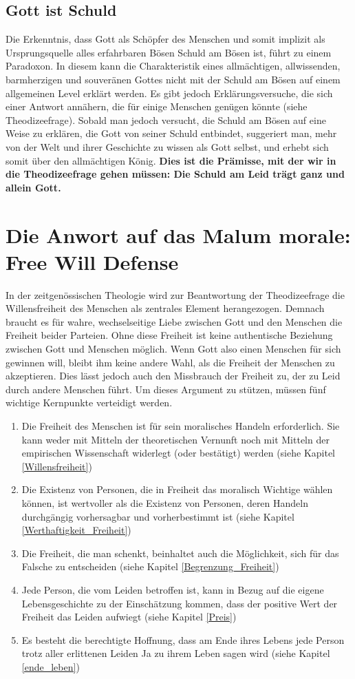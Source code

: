 \subsection{Gott ist Schuld}
Die Erkenntnis, dass Gott als Schöpfer des Menschen und somit implizit als Ursprungsquelle alles erfahrbaren Bösen Schuld am Bösen ist, führt zu einem Paradoxon. In diesem kann die Charakteristik eines allmächtigen, allwissenden, barmherzigen und souveränen Gottes nicht mit der Schuld am Bösen auf einem allgemeinen Level erklärt werden. Es gibt jedoch Erklärungsversuche, die sich einer Antwort annähern, die für einige Menschen genügen könnte (siehe Theodizeefrage). Sobald man jedoch versucht, die Schuld am Bösen auf eine Weise zu erklären, die Gott von seiner Schuld entbindet, suggeriert man, mehr von der Welt und ihrer Geschichte zu wissen als Gott selbst, und erhebt sich somit über den allmächtigen König. \textbf{Dies ist die Prämisse, mit der wir in die Theodizeefrage gehen müssen: Die Schuld am Leid trägt ganz und allein Gott.}
    
\section{Die Anwort auf das Malum morale: Free Will Defense} \label{free_will_defense}
In der zeitgenössischen Theologie wird zur Beantwortung der Theodizeefrage die Willensfreiheit des Menschen als zentrales Element herangezogen. Demnach braucht es für wahre, wechselseitige Liebe zwischen Gott und den Menschen die Freiheit beider Parteien. Ohne diese Freiheit ist keine authentische Beziehung zwischen Gott und Menschen möglich. Wenn Gott also einen Menschen für sich gewinnen will, bleibt ihm keine andere Wahl, als die Freiheit der Menschen zu akzeptieren. Dies lässt jedoch auch den Missbrauch der Freiheit zu, der zu Leid durch andere Menschen führt. Um dieses Argument zu stützen, müssen fünf wichtige Kernpunkte verteidigt werden.
\begin{enumerate}
	\item Die Freiheit des Menschen ist für sein moralisches Handeln erforderlich. Sie kann weder mit Mitteln der theoretischen Vernunft noch mit Mitteln der empirischen Wissenschaft widerlegt (oder bestätigt) werden (siehe Kapitel \ref{Willensfreiheit})
	\item Die Existenz von Personen, die in Freiheit das moralisch Wichtige wählen können, ist wertvoller als die Existenz von Personen, deren Handeln durchgängig vorhersagbar und vorherbestimmt ist (siehe Kapitel \ref{Werthaftigkeit_Freiheit})
	\item Die Freiheit, die man schenkt, beinhaltet auch die Möglichkeit, sich für das Falsche zu entscheiden (siehe Kapitel \ref{Begrenzung_Freiheit})
	\item Jede Person, die vom Leiden betroffen ist, kann in Bezug auf die eigene Lebensgeschichte zu der Einschätzung kommen, dass der positive Wert der Freiheit das Leiden aufwiegt (siehe Kapitel \ref{Preis})
	\item Es besteht die berechtigte Hoffnung, dass am Ende ihres Lebens jede Person trotz aller erlittenen Leiden Ja zu ihrem Leben sagen wird (siehe Kapitel \ref{ende_leben})
\end{enumerate}

